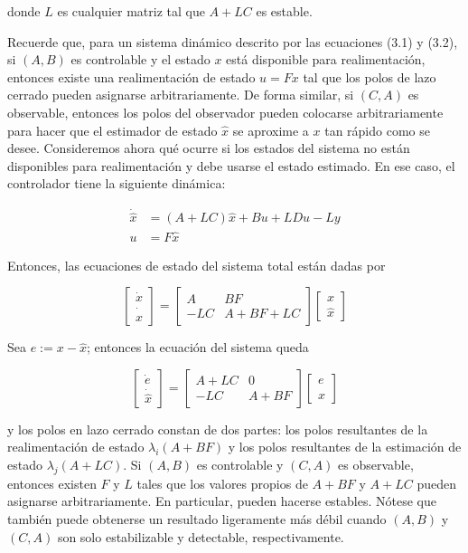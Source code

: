 donde $L$ es cualquier matriz tal que $A+L C$ es estable.

Recuerde que, para un sistema dinámico descrito por las ecuaciones (3.1) y (3.2), si $(A, B)$ es controlable y el estado $x$ está disponible para realimentación, entonces existe una realimentación de estado $u=F x$ tal que los polos de lazo cerrado pueden asignarse arbitrariamente. De forma similar, si $(C, A)$ es observable, entonces los polos del observador pueden colocarse arbitrariamente para hacer que el estimador de estado $\hat{x}$ se aproxime a $x$ tan rápido como se desee. Consideremos ahora qué ocurre si los estados del sistema no están disponibles para realimentación y debe usarse el estado estimado. En ese caso, el controlador tiene la siguiente dinámica:

$$
\begin{aligned}
\dot{\hat{x}} & =(A+L C) \hat{x}+B u+L D u-L y \\
u & =F \hat{x}
\end{aligned}
$$

Entonces, las ecuaciones de estado del sistema total están dadas por

$$
\left[\begin{array}{c}
\dot{x} \\
\dot{\hat{x}}
\end{array}\right]=\left[\begin{array}{cc}
A & B F \\
-L C & A+B F+L C
\end{array}\right]\left[\begin{array}{l}
x \\
\hat{x}
\end{array}\right]
$$

Sea $e:=x-\hat{x}$; entonces la ecuación del sistema queda

$$
\left[\begin{array}{c}
\dot{e} \\
\dot{\hat{x}}
\end{array}\right]=\left[\begin{array}{cc}
A+L C & 0 \\
-L C & A+B F
\end{array}\right]\left[\begin{array}{l}
e \\
\hat{x}
\end{array}\right]
$$

y los polos en lazo cerrado constan de dos partes: los polos resultantes de la realimentación de estado $\lambda_{i}(A+B F)$ y los polos resultantes de la estimación de estado $\lambda_{j}(A+L C)$. Si $(A, B)$ es controlable y $(C, A)$ es observable, entonces existen $F$ y $L$ tales que los valores propios de $A+B F$ y $A+L C$ pueden asignarse arbitrariamente. En particular, pueden hacerse estables. Nótese que también puede obtenerse un resultado ligeramente más débil cuando $(A, B)$ y $(C, A)$ son solo estabilizable y detectable, respectivamente.

